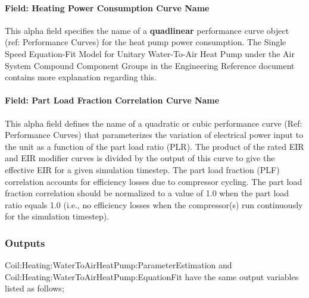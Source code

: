 \paragraph{Field: Heating Power Consumption Curve Name}\label{field-heating-power-consumption-curve-name}

This alpha field specifies the name of a \textbf{quadlinear} performance curve object (ref: Performance Curves) for the heat pump power consumption. The Single Speed Equation-Fit Model for Unitary Water-To-Air Heat Pump under the Air System Compound Component Groups in the Engineering Reference document contains more explanation regarding this.

\paragraph{Field: Part Load Fraction Correlation Curve Name}\label{field-part-load-fraction-correlation-curve-name-efh}

This alpha field defines the name of a quadratic or cubic performance curve (Ref: Performance Curves) that parameterizes the variation of electrical power input to the unit as a function of the part load ratio (PLR). The product of the rated EIR and EIR modifier curves is divided by the output of this curve to give the effective EIR for a given simulation timestep. The part load fraction (PLF) correlation accounts for efficiency losses due to compressor cycling. The part load fraction correlation should be normalized to a value of 1.0 when the part load ratio equals 1.0 (i.e., no efficiency losses when the compressor(s) run continuously for the simulation timestep).

\subsubsection{Outputs}\label{outputs-27}

Coil:Heating:WaterToAirHeatPump:ParameterEstimation and Coil:Heating:WaterToAirHeatPump:EquationFit have the same output variables listed as follows;

